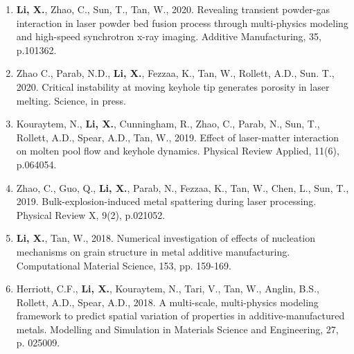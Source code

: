 \documentclass[11pt, letterpaper]{article}
\begin{document}
\begin{enumerate}[leftmargin=*, labelsep=4mm]
   \item \textbf{Li, X.}, Zhao, C., Sun, T., Tan, W., 2020. Revealing transient powder-gas
      interaction in laser powder bed fusion process through multi-physics modeling and high-speed
      synchrotron x-ray imaging. Additive Manufacturing, 35, p.101362. 

   \item Zhao C., Parab, N.D., \textbf{Li, X.}, Fezzaa, K., Tan, W., Rollett, A.D., Sun. T., 2020.
      Critical instability at moving keyhole tip generates porosity in laser melting. Science,
      in press. 

   \item Kouraytem, N., \textbf{Li, X.}, Cunningham, R., Zhao, C., Parab, N., Sun, T., Rollett,
      A.D., Spear, A.D., Tan, W., 2019. Effect of laser-matter interaction on molten pool flow and
      keyhole dynamics. Physical Review Applied, 11(6), p.064054.

   \item Zhao, C., Guo, Q., \textbf{Li, X.}, Parab, N., Fezzaa, K., Tan, W., Chen, L., Sun, T.,
      2019. Bulk-explosion-induced metal spattering during laser processing. Physical Review X,
      9(2), p.021052.

   \item \textbf{Li, X.}, Tan, W., 2018. Numerical investigation of effects of nucleation mechanisms
      on grain structure in metal additive manufacturing. Computational Material Science, 153, pp.
      159-169.

   \item Herriott, C.F., \textbf{Li, X.}, Kouraytem, N., Tari, V., Tan, W., Anglin, B.S., Rollett, A.D.,
      Spear, A.D., 2018. A multi-scale, multi-physics modeling framework to predict spatial
      variation of properties in additive-manufactured metals. Modelling and Simulation in
      Materials Science and Engineering, 27, p. 025009.
\end{enumerate}
\end{document}
